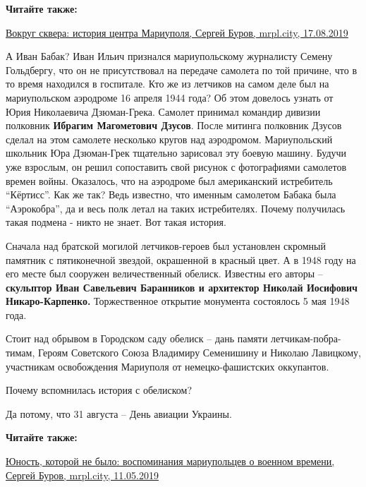 \vspace{0.5cm}
\begin{minipage}{0.9\textwidth}
\textbf{Читайте также:} 

\href{https://archive.org/details/17_08_2019.sergij_burov.mrpl_city.vokrug_skvera_istoria_centra_mariupoljaia-centra-mariupolja}{%
Вокруг сквера: история центра Мариуполя, Сергей Буров, mrpl.city, 17.08.2019}
\end{minipage}
\vspace{0.5cm}

А Иван Бабак? Иван Ильич признался мариупольскому журналисту Семену Гольдбергу,
что он не присутствовал на передаче самолета по той причине, что в то время
находился в госпитале. Кто же из летчиков на самом деле был на мариупольском
аэродроме 16 апреля 1944 года? Об этом довелось узнать от Юрия Николаевича
Дзюман-Грека. Самолет принимал командир дивизии полковник \textbf{Ибрагим Магометович
Дзусов}. После митинга полковник Дзусов сделал на этом самолете несколько кругов
над аэродромом. Мариупольский школьник Юра Дзюман-Грек тщательно зарисовал эту
боевую машину. Будучи уже взрослым, он решил сопоставить свой рисунок с
фотографиями самолетов времен войны. Оказалось, что на аэродроме был
американский истребитель \enquote{Кёртисс}. Как же так? Ведь известно, что именным
самолетом Бабака была \enquote{Аэрокобра}, да и весь полк летал на таких истребителях.
Почему получилась такая подмена - никто не знает. Вот такая история.

Сначала над братской могилой летчиков-героев был установлен скромный памятник с
пятиконечной звездой, окрашенной в красный цвет. А в 1948 году на его месте был
сооружен величественный обелиск. Известны его авторы – \textbf{скульптор Иван
Савельевич Баранников и архитектор Николай Иосифович Никаро-Карпенко.}
Торжественное открытие монумента состоялось 5 мая 1948 года.

Стоит над обрывом в Городском саду обелиск – дань памяти летчикам-побра\hyp{}тимам,
Героям Советского Союза Владимиру Семенишину и Николаю Лавицкому, участникам
освобождения Мариуполя от немецко-фашистских оккупантов.

Почему вспомнилась история с обелиском?

Да потому, что 31 августа – День авиации Украины.

\textbf{Читайте также:}

\href{https://archive.org/details/11_05_2019.sergij_burov.mrpl_city.junost_kotoroj_ne_bylo_vospominania_vojna}{%
Юность, которой не было: воспоминания мариупольцев о военном времени, Сергей Буров, mrpl.city, 11.05.2019}


